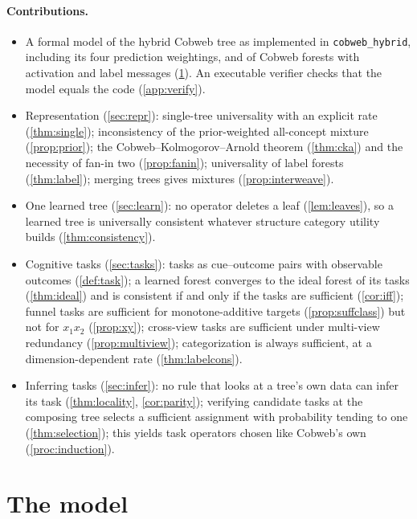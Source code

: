 \documentclass[11pt]{article}
\theoremstyle{definition}
\theoremstyle{remark}
\begin{document}
\paragraph{Contributions.}
\begin{itemize}[leftmargin=*]
\item A formal model of the hybrid Cobweb tree as implemented in
  \texttt{cobweb\_hybrid}, including its four prediction weightings, and of Cobweb
  forests with activation and label messages (\cref{sec:model}).  An executable verifier
  checks that the model equals the code (\cref{app:verify}).
\item Representation (\cref{sec:repr}): single-tree universality with an explicit
  rate (\cref{thm:single}); inconsistency of the prior-weighted all-concept mixture
  (\cref{prop:prior}); the Cobweb--Kolmogorov--Arnold theorem (\cref{thm:cka}) and the
  necessity of fan-in two (\cref{prop:fanin}); universality of label forests
  (\cref{thm:label}); merging trees gives mixtures (\cref{prop:interweave}).
\item One learned tree (\cref{sec:learn}): no operator deletes a leaf
  (\cref{lem:leaves}), so a learned tree is universally consistent whatever structure
  category utility builds (\cref{thm:consistency}).
\item Cognitive tasks (\cref{sec:tasks}): tasks as cue--outcome pairs with observable
  outcomes (\cref{def:task}); a learned forest converges to the ideal forest of its tasks
  (\cref{thm:ideal}) and is consistent if and only if the tasks are sufficient
  (\cref{cor:iff}); funnel tasks are sufficient for monotone-additive targets
  (\cref{prop:suffclass}) but not for $x_1x_2$ (\cref{prop:xy}); cross-view tasks are
  sufficient under multi-view redundancy (\cref{prop:multiview}); categorization is
  always sufficient, at a dimension-dependent rate (\cref{thm:labelcons}).
\item Inferring tasks (\cref{sec:infer}): no rule that looks at a tree's own data can
  infer its task (\cref{thm:locality}, \cref{cor:parity}); verifying candidate tasks at
  the composing tree selects a sufficient assignment with probability tending to one
  (\cref{thm:selection}); this yields task operators chosen like Cobweb's own
  (\cref{proc:induction}).
\end{itemize}

\section{The model}\label{sec:model}
\end{document}
